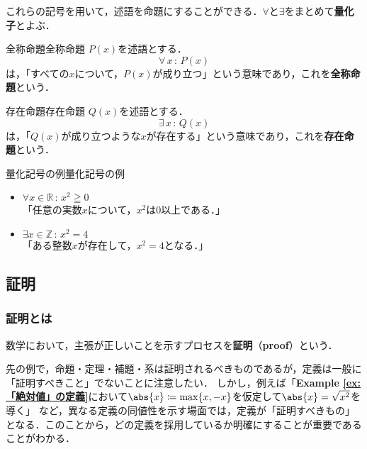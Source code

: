 \documentclass[a4paper,11pt]{ltjsarticle}
\renewcommand{\emph}[1]{\textbf{#1}}
\newcommand{\exref}[1]{{\bfseries\sffamily Example \ref{ex:#1}}}
\renewcommand{\geq}{\geqq}
\begin{document}
      これらの記号を用いて，述語を命題にすることができる．$\forall$と$\exists$をまとめて\emph{量化子}とよぶ．

    \begin{definition}{全称命題}{全称命題}
      $P(x)$を述語とする．
        \[
          \forall\, x \, : \, P(x)
        \]
        は，「すべての$x$について，$P(x)$が成り立つ」という意味であり，これを\emph{全称命題}という．
    \end{definition}
    
    \begin{definition}{存在命題}{存在命題}
      $Q(x)$を述語とする．
        \[
        \exists \,  x\, : \, Q(x)
        \]
        は，「$Q(x)$が成り立つような$x$が存在する」という意味であり，これを\emph{存在命題}という．
    \end{definition}
    
    \begin{example}{量化記号の例}{量化記号の例}
        \begin{itemize}
            \item $\forall x \in \mathbb{R}\, : \, x^2 \geq 0$\\
            「任意の実数$x$について，$x^2$は$0$以上である．」
            \item $\exists x \in \mathbb{Z} \, : \, x^2 = 4$\\
            「ある整数$x$が存在して，$x^2 = 4$となる．」
        \end{itemize}
    \end{example}

    \subsection{証明}

    \subsubsection{証明とは}
    数学において，主張が正しいことを示すプロセスを\emph{証明}（\emph{proof}）という．
    
    先の例で，命題・定理・補題・系は証明されるべきものであるが，定義は一般に「証明すべきこと」でないことに注意したい．
    しかし，例えば「\exref{「絶対値」の定義}において$\abs{x} \coloneqq \max \{ x, -x \}$を仮定して$\abs{x} = \sqrt{x^2}$を導く」
    など，異なる定義の同値性を示す場面では，定義が「証明すべきもの」となる．このことから，どの定義を採用しているか明確にすることが重要であることがわかる．
\end{document}
